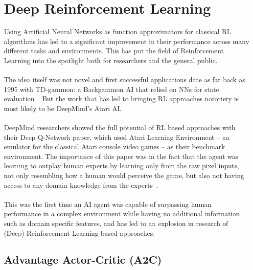 \section{Deep Reinforcement Learning}

Using Artificial Neural Networks as function approximators for classical RL algorithms has led to a significant improvement in their performance across many different tasks and environments. This has put the field of Reinforcement Learning into the spotlight both for researchers and the general public. 
\\\\
The idea itself was not novel and first successful applications date as far back as 1995 with TD-gammon: a Backgammon AI that relied on NNs for state evaluation~\cite{Tesauro1995}. But the work that has led to bringing RL approaches notoriety is most likely to be DeepMind’s Atari AI. 
\\\\
DeepMind researchers showed the full potential of RL based approaches with their Deep Q-Network paper, which used Atari Learning Environment -- an emulator for the classical Atari console video games -- as their benchmark environment. The importance of this paper was in the fact that the agent was learning to outplay human experts by learning only from the raw pixel inputs, not only resembling how a human would perceive the game, but also not having access to any domain knowledge from the experts~\cite{Mnih2015}.
\\\\
This was the first time an AI agent was capable of surpassing human performance in a complex environment while having no additional information such as domain specific features, and has led to an explosion in research of (Deep) Reinforcement Learning based approaches. 

\subsection{Advantage Actor-Critic (A2C)}

